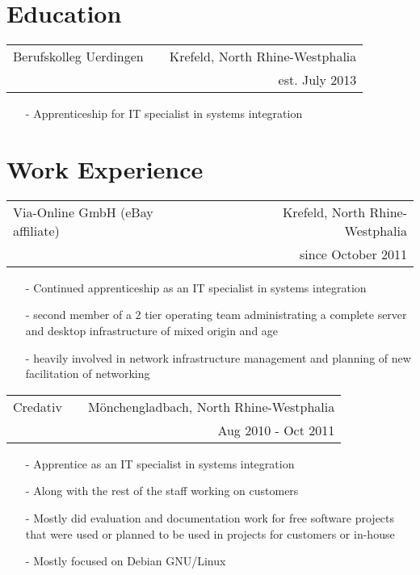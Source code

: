 \documentclass[11pt]{article}
\begin{document}
\section*{Education}

\begin{tabular}{@{ } l @{} p{3cm} @{} r @{ }}
  Berufskolleg Uerdingen & & Krefeld, North Rhine-Westphalia \\
  & & est. July 2013 \\
\end{tabular}

\begin{itemize}
  \item[-] Apprenticeship for IT specialist in systems integration
\end{itemize} 

\section*{Work Experience}

\begin{tabular}{@{ } l @{} p{1.2cm} @{} r @{ }}
  Via-Online GmbH (eBay affiliate) & & Krefeld, North Rhine-Westphalia\\
  & & since October 2011 \\
\end{tabular}

\begin{itemize}
  \item[-] Continued apprenticeship as an IT specialist in
    systems integration
  \item[-] second member of a 2 tier operating team administrating a
    complete server and desktop infrastructure of mixed origin and
    age
  \item[-] heavily involved in network infrastructure management and
    planning of new facilitation of networking
\end{itemize}

\begin{tabular}{@{ } l @{} p{3.6cm} @{} r @{ }}
  Credativ & & Mönchengladbach, North Rhine-Westphalia\\
  & & Aug 2010 - Oct 2011 \\
\end{tabular}

\begin{itemize}
  \item[-] Apprentice as an IT specialist in systems integration
  \item[-] Along with the rest of the staff working on customers
  \item[-] Mostly did evaluation and documentation work for free
    software projects that were used or planned to be used in projects
    for customers or in-house
  \item[-] Mostly focused on Debian GNU/Linux
\end{itemize}
\end{document}
